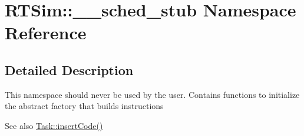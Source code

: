 \hypertarget{namespaceRTSim_1_1____sched__stub}{}\section{R\+T\+Sim\+:\+:\+\_\+\+\_\+sched\+\_\+stub Namespace Reference}
\label{namespaceRTSim_1_1____sched__stub}


\subsection{Detailed Description}
This namespace should never be used by the user. Contains functions to initialize the abstract factory that builds instructions \begin{DoxySeeAlso}{See also}
\hyperlink{classRTSim_1_1Task_adf7514e4b8692e09972c299f41f5d399}{Task\+::insert\+Code()} 
\end{DoxySeeAlso}

